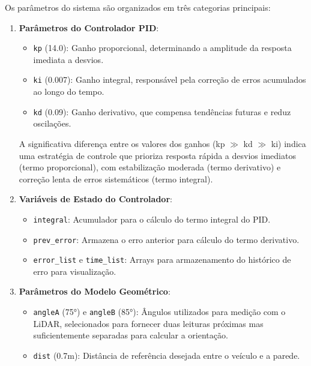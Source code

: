 Os parâmetros do sistema são organizados em três categorias principais:

\begin{enumerate}
    \item \textbf{Parâmetros do Controlador PID}:
          \begin{itemize}
              \item \texttt{kp} (14.0): Ganho proporcional, determinando a amplitude da resposta imediata a desvios.
              \item \texttt{ki} (0.007): Ganho integral, responsável pela correção de erros acumulados ao longo do tempo.
              \item \texttt{kd} (0.09): Ganho derivativo, que compensa tendências futuras e reduz oscilações.
          \end{itemize}

          A significativa diferença entre os valores dos ganhos (kp $\gg$ kd $\gg$ ki)
          indica uma estratégia de controle que prioriza resposta rápida a desvios
          imediatos (termo proporcional), com estabilização moderada (termo derivativo) e
          correção lenta de erros sistemáticos (termo integral).

    \item \textbf{Variáveis de Estado do Controlador}:
          \begin{itemize}
              \item \texttt{integral}: Acumulador para o cálculo do termo integral do PID.
              \item \texttt{prev\_error}: Armazena o erro anterior para cálculo do termo derivativo.
              \item \texttt{error\_list} e \texttt{time\_list}: Arrays para armazenamento do histórico de erro para visualização.
          \end{itemize}

    \item \textbf{Parâmetros do Modelo Geométrico}:
          \begin{itemize}
              \item \texttt{angleA} (75°) e \texttt{angleB} (85°): Ângulos utilizados para medição com o LiDAR, selecionados para fornecer duas leituras próximas mas suficientemente separadas para calcular a orientação.
              \item \texttt{dist} (0.7m): Distância de referência desejada entre o veículo e a parede.
          \end{itemize}
\end{enumerate}

